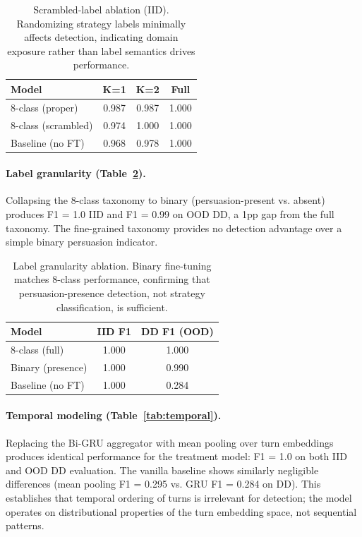 \documentclass[11pt]{article}
\begin{document}
\begin{table}[t]
\centering
\caption{Scrambled-label ablation (IID). Randomizing strategy labels minimally affects detection, indicating domain exposure rather than label semantics drives performance.}
\label{tab:scrambled}
\begin{tabular}{lccc}
\toprule
\textbf{Model} & \textbf{K=1} & \textbf{K=2} & \textbf{Full} \\
\midrule
8-class (proper) & 0.987 & 0.987 & 1.000 \\
8-class (scrambled) & 0.974 & 1.000 & 1.000 \\
Baseline (no FT) & 0.968 & 0.978 & 1.000 \\
\bottomrule
\end{tabular}
\end{table}

\paragraph{Label granularity (Table~\ref{tab:granularity}).}
Collapsing the 8-class taxonomy to binary (persuasion-present vs. absent) produces F1 = 1.0 IID and F1 = 0.99 on OOD DD, a 1pp gap from the full taxonomy. The fine-grained taxonomy provides no detection advantage over a simple binary persuasion indicator.

\begin{table}[t]
\centering
\caption{Label granularity ablation. Binary fine-tuning matches 8-class performance, confirming that persuasion-presence detection, not strategy classification, is sufficient.}
\label{tab:granularity}
\begin{tabular}{lcc}
\toprule
\textbf{Model} & \textbf{IID F1} & \textbf{DD F1 (OOD)} \\
\midrule
8-class (full) & 1.000 & 1.000 \\
Binary (presence) & 1.000 & 0.990 \\
Baseline (no FT) & 1.000 & 0.284 \\
\bottomrule
\end{tabular}
\end{table}

\paragraph{Temporal modeling (Table~\ref{tab:temporal}).}
Replacing the Bi-GRU aggregator with mean pooling over turn embeddings produces identical performance for the treatment model: F1 = 1.0 on both IID and OOD DD evaluation. The vanilla baseline shows similarly negligible differences (mean pooling F1 = 0.295 vs. GRU F1 = 0.284 on DD). This establishes that temporal ordering of turns is irrelevant for detection; the model operates on distributional properties of the turn embedding space, not sequential patterns.
\end{document}
